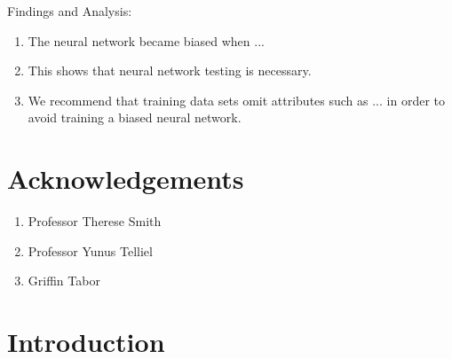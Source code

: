\documentclass{report}
\begin{document}
Findings and Analysis:
\begin{enumerate}
    \item The neural network became biased when ...
    
    \item This shows that neural network testing is necessary.
    
    \item We recommend that training data sets omit attributes such as ... in order to avoid
    training a biased neural network.
\end{enumerate}

\chapter*{Acknowledgements}

\begin{enumerate}
    \item Professor Therese Smith
    \item Professor Yunus Telliel
    \item Griffin Tabor
\end{enumerate}

\tableofcontents

\chapter{Introduction}
\end{document}
